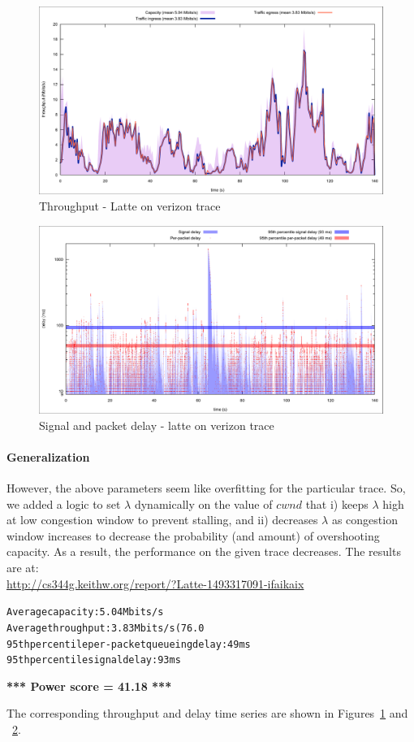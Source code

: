 \documentclass{article}
\begin{document}
\begin{figure}[h]
\includegraphics[width=1.2\columnwidth]{"tput"}
\caption{Throughput - Latte on verizon trace}
\label{tput}
\end{figure}

\begin{figure}[h]
\includegraphics[width=1.2\columnwidth]{"delay"}
\caption{Signal and packet delay - latte on verizon trace}
\label{delay}
\end{figure}


\paragraph{Generalization} However, the above parameters seem like
overfitting for the particular trace. So, we added a logic to set
$\lambda$ dynamically on the value of $cwnd$ that i) keeps
$\lambda$ high at low congestion window to prevent stalling, and ii)
decreases $\lambda$ as congestion window increases to decrease the
probability (and amount) of overshooting capacity. As a result, the
performance on the given trace decreases. The results are at:\\
\url{http://cs344g.keithw.org/report/?Latte-1493317091-ifaikaix}
\begin{mdframed}
\begin{alltt}
Average capacity: 5.04 Mbits/s
Average throughput: 3.83 Mbits/s (76.0%
95th percentile per-packet queueing delay: 49 ms
95th percentile signal delay: 93 ms
\end{alltt}

\textbf{*** Power score = 41.18 ***}
\end{mdframed}
The corresponding throughput and delay time series are shown in
Figures~\ref{tput} and ~\ref{delay}.
\end{document}
